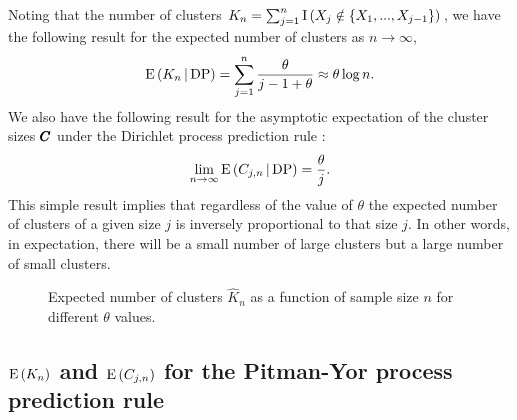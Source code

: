 \documentclass[]{article}
\begin{document}
Noting that the number of clusters $K_n = \sum_{j = 1}^n {\rm I}\,
(X_j \notin \{X_1,...,X_{j - 1}\})$, we have the following result for
the expected number of clusters as $n \to \infty$,
\begin{equation}
{\rm E}\,(K_n\,|\,{\rm DP}) = \sum_{j = 1}^n \frac{\theta}{j -
  1 + \theta}  \approx \theta \log n. \label{DPmom2}
\end{equation}
We also have the following result for the asymptotic expectation of
the cluster sizes $\pmb{C}$ under the Dirichlet process prediction rule
\cite{ArrBarTav03}: 
\begin{equation}
\lim_{n \to \infty} {\rm E}\,(C_{j,n}\,|\,{\rm DP}) = 
\frac{\theta}{j}.   \label{DPmom1}
\end{equation}
This simple result implies that regardless of the value of $\theta$
the expected number of clusters of a given size $j$ is inversely
proportional to that size $j$. In other words, in expectation, there
will be a small number of large clusters but a large number of small
clusters.

\begin{figure}[ht]
\begin{center}
\end{center}
\caption{Expected number of clusters $\hat{K}_n$ as a function of
  sample size $n$ for different $\theta$ values.
}\label{numberofclusters}
\end{figure}

\subsection{${\rm E}\,(K_n)$ and ${\rm E}\,(C_{j,n})$ for the Pitman-Yor
  process prediction rule} \label{PY_asymptotic}
\end{document}
